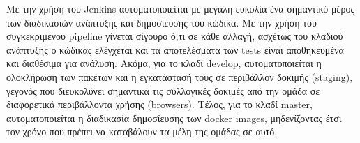 Με την χρήση του Jenkins αυτοματοποιείται με μεγάλη ευκολία ένα σημαντικό μέρος των διαδικασιών ανάπτυξης και δημοσίευσης του κώδικα. Με την χρήση του συγκεκριμένου pipeline γίνεται σίγουρο ό,τι σε κάθε αλλαγή, ασχέτως του κλαδιού ανάπτυξης ο κώδικας ελέγχεται και τα αποτελέσματα των tests είναι αποθηκευμένα και διαθέσιμα για ανάλυση. Ακόμα, για το κλαδί develop, αυτοματοποιείται η ολοκλήρωση των πακέτων και η εγκατάστασή τους σε περιβάλλον δοκιμής (staging), γεγονός που διευκολύνει σημαντικά τις συλλογικές δοκιμές από την ομάδα σε διαφορετικά περιβάλλοντα χρήσης (browsers). Τέλος, για το κλαδί master, αυτοματοποιείται η διαδικασία δημοσίευσης των docker images, μηδενίζοντας έτσι τον χρόνο που πρέπει να καταβάλουν τα μέλη της ομάδας σε αυτό.
